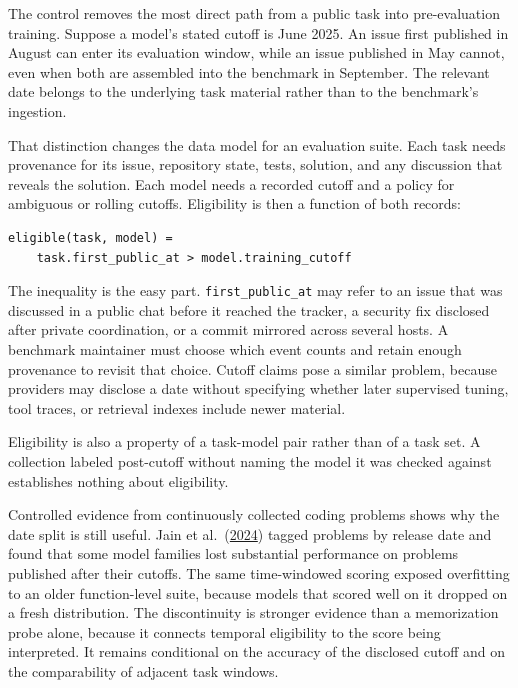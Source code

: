 The control removes the most direct path from a public task into pre-evaluation training. Suppose a model's stated cutoff is June 2025. An issue first published in August can enter its evaluation window, while an issue published in May cannot, even when both are assembled into the benchmark in September. The relevant date belongs to the underlying task material rather than to the benchmark's ingestion.

That distinction changes the data model for an evaluation suite. Each task needs provenance for its issue, repository state, tests, solution, and any discussion that reveals the solution. Each model needs a recorded cutoff and a policy for ambiguous or rolling cutoffs. Eligibility is then a function of both records:

\begin{verbatim}
eligible(task, model) =
    task.first_public_at > model.training_cutoff
\end{verbatim}

The inequality is the easy part. \texttt{first\_public\_at} may refer to an issue that was discussed in a public chat before it reached the tracker, a security fix disclosed after private coordination, or a commit mirrored across several hosts. A benchmark maintainer must choose which event counts and retain enough provenance to revisit that choice. Cutoff claims pose a similar problem, because providers may disclose a date without specifying whether later supervised tuning, tool traces, or retrieval indexes include newer material.

Eligibility is also a property of a task-model pair rather than of a task set. A collection labeled post-cutoff without naming the model it was checked against establishes nothing about eligibility.

Controlled evidence from continuously collected coding problems shows why the date split is still useful. Jain et al.~(\href{https://arxiv.org/abs/2403.07974}{2024}) tagged problems by release date and found that some model families lost substantial performance on problems published after their cutoffs. The same time-windowed scoring exposed overfitting to an older function-level suite, because models that scored well on it dropped on a fresh distribution. The discontinuity is stronger evidence than a memorization probe alone, because it connects temporal eligibility to the score being interpreted. It remains conditional on the accuracy of the disclosed cutoff and on the comparability of adjacent task windows.

